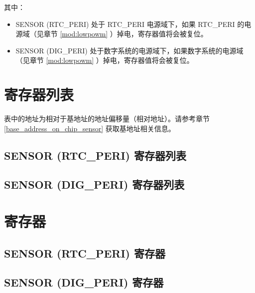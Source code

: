 \documentclass[main\_\_CN.tex]{subfiles}
\begin{document}
其中：
\begin{itemize}
    \item SENSOR (RTC\_PERI) 处于 RTC\_PERI 电源域下，如果 RTC\_PERI 的电源域（见章节 \ref{mod:lowpowm} \textit{}）掉电，寄存器值将会被复位。
    \item SENSOR (DIG\_PERI) 处于数字系统的电源域下，如果数字系统的电源域（见章节 \ref{mod:lowpowm} \textit{}）掉电，寄存器值将会被复位。
\end{itemize}

\hypertarget{sensor-reg-summ}{}
\section{寄存器列表}


表中的地址为相对于基地址的地址偏移量（相对地址）。请参考章节 \ref{base_address_on_chip_sensor} 获取基地址相关信息。


\subsection{SENSOR (RTC\_PERI) 寄存器列表}


\subsection{SENSOR (DIG\_PERI) 寄存器列表}


\newpage
\section{寄存器}
\label{section:registers}

\subsection{SENSOR (RTC\_PERI) 寄存器}


\subsection{SENSOR (DIG\_PERI) 寄存器}

\end{document}
